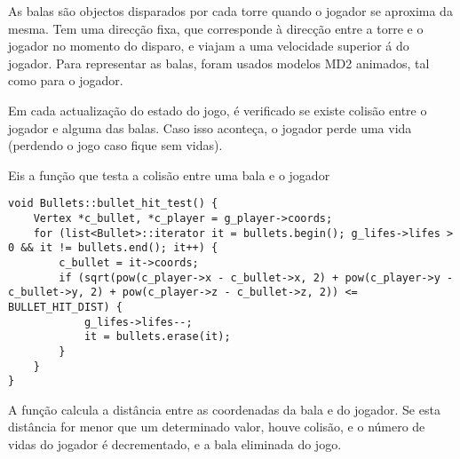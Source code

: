 As balas são objectos disparados por cada torre quando o jogador se aproxima da mesma.
Tem uma direcção fixa, que corresponde à direcção entre a torre e o jogador no momento do disparo, e viajam a uma velocidade superior á do jogador.
Para representar as balas, foram usados modelos MD2 animados, tal como para o jogador.

Em cada actualização do estado do jogo, é verificado se existe colisão entre o jogador e alguma das balas. Caso isso aconteça, o jogador perde uma vida (perdendo o jogo caso fique sem vidas).

Eis a função que testa a colisão entre uma bala e o jogador

\begin{lstlisting}
void Bullets::bullet_hit_test() {
    Vertex *c_bullet, *c_player = g_player->coords;
    for (list<Bullet>::iterator it = bullets.begin(); g_lifes->lifes > 0 && it != bullets.end(); it++) {
        c_bullet = it->coords;
        if (sqrt(pow(c_player->x - c_bullet->x, 2) + pow(c_player->y - c_bullet->y, 2) + pow(c_player->z - c_bullet->z, 2)) <= BULLET_HIT_DIST) {
            g_lifes->lifes--;
			it = bullets.erase(it);
        }
    }
}
\end{lstlisting}

A função calcula a distância entre as coordenadas da bala e do jogador. Se esta distância for menor que um determinado valor, houve colisão, e o número de vidas do jogador é decrementado, e a bala eliminada do jogo.
